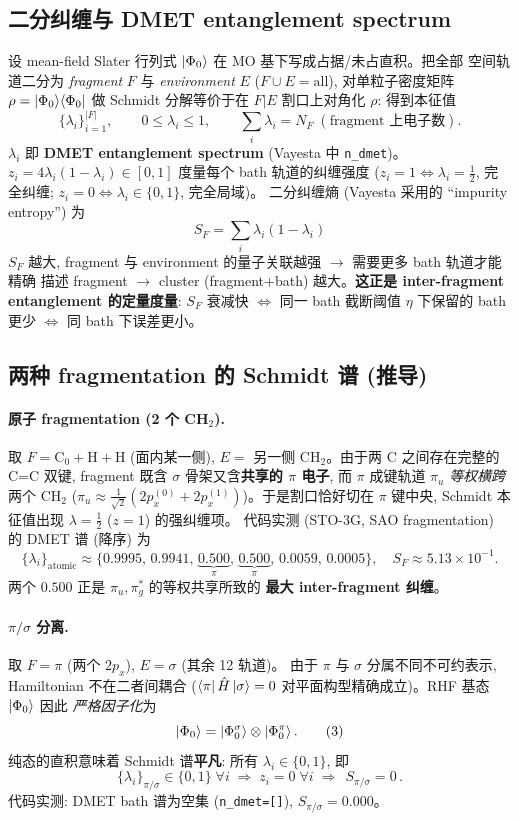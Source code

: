 \documentclass[11pt]{article}
\newcommand{\sig}{\sigma}
\begin{document}
\subsection{二分纠缠与 DMET entanglement spectrum}
设 mean-field Slater 行列式 $\ket{\Phi_0}$ 在 MO 基下写成占据/未占直积。把全部
空间轨道二分为 \emph{fragment} $F$ 与 \emph{environment} $E$ ($F\cup E=\text{all}$),
对单粒子密度矩阵 $\rho = \ket{\Phi_0}\!\bra{\Phi_0}$ 做 Schmidt 分解等价于在 $F|E$
割口上对角化 $\rho$: 得到本征值
\[
  \{\lambda_i\}_{i=1}^{|F|},\qquad 0\le \lambda_i\le 1,\qquad
  \sum_i \lambda_i = N_F\;(\text{fragment 上电子数}).
\]
$\lambda_i$ 即 \textbf{DMET entanglement spectrum} (Vayesta 中 \texttt{n\_dmet})。
$z_i=4\lambda_i(1-\lambda_i)\in[0,1]$ 度量每个 bath 轨道的纠缠强度
($z_i=1\!\Leftrightarrow\!\lambda_i=\tfrac12$, 完全纠缠; $z_i=0\!\Leftrightarrow\!\lambda_i\in\{0,1\}$, 完全局域)。
二分纠缠熵 (Vayesta 采用的 ``impurity entropy'') 为
\[
  \boxed{\;S_F=\sum_i \lambda_i(1-\lambda_i)\;}
  \tag{1}
\]
$S_F$ 越大, fragment 与 environment 的量子关联越强 $\to$ 需要更多 bath 轨道才能精确
描述 fragment $\to$ cluster (fragment+bath) 越大。\textbf{这正是 inter-fragment
entanglement 的定量度量}: $S_F$ 衰减快 $\Leftrightarrow$ 同一 bath 截断阈值
$\eta$ 下保留的 bath 更少 $\Leftrightarrow$ 同 bath 下误差更小。

\subsection{两种 fragmentation 的 Schmidt 谱 (推导)}
\paragraph{原子 fragmentation (2 个 CH$_2$).} 取 $F=\text{C}_0{+}\text{H}{+}\text{H}$
(面内某一侧), $E=$ 另一侧 CH$_2$。由于两 C 之间存在完整的 C=C 双键, fragment 既含
$\sig$ 骨架又含\textbf{共享的 $\pi$ 电子}, 而 $\pi$ 成键轨道 $\pi_u$ \emph{等权横跨}两个
CH$_2$ ($\pi_u\approx\tfrac1{\sqrt2}(2p_x^{(0)}+2p_x^{(1)})$)。于是割口恰好切在
$\pi$ 键中央, Schmidt 本征值出现 $\lambda=\tfrac12$ ($z=1$) 的强纠缠项。
代码实测 (STO-3G, SAO fragmentation) 的 DMET 谱 (降序) 为
\[
  \{\lambda_i\}_{\text{atomic}}\approx\{0.9995,\,0.9941,\,\underbrace{0.500}_{\pi},\,\underbrace{0.500}_{\pi},\,0.0059,\,0.0005\},
  \quad S_F\approx 5.13\times10^{-1}.
  \tag{2}
\]
两个 $0.500$ 正是 $\pi_u,\pi_g^*$ 的等权共享所致的 \textbf{最大 inter-fragment 纠缠}。

\paragraph{$\pi/\sigma$ 分离.} 取 $F=\pi$ (两个 $2p_x$), $E=\sig$ (其余 12 轨道)。
由于 $\pi$ 与 $\sig$ 分属不同不可约表示, Hamiltonian 不在二者间耦合
($\bra{\pi}\hat H\ket{\sig}=0$ 对平面构型精确成立)。RHF 基态 $\ket{\Phi_0}$ 因此
\emph{严格因子化}为
\[
  \ket{\Phi_0}=\ket{\Phi_0^\sig}\otimes\ket{\Phi_0^\pi}.
  \tag{3}
\]
纯态的直积意味着 Schmidt 谱\textbf{平凡}: 所有 $\lambda_i\in\{0,1\}$, 即
\[
  \{\lambda_i\}_{\pi/\sig}\in\{0,1\}\;\forall i
  \;\Longrightarrow\; z_i=0\;\forall i
  \;\Longrightarrow\; \boxed{\,S_{\pi/\sig}=0\,}.
  \tag{4}
\]
代码实测: DMET bath 谱为空集 (\texttt{n\_dmet=[]}), $S_{\pi/\sig}=0.000$。
\end{document}
